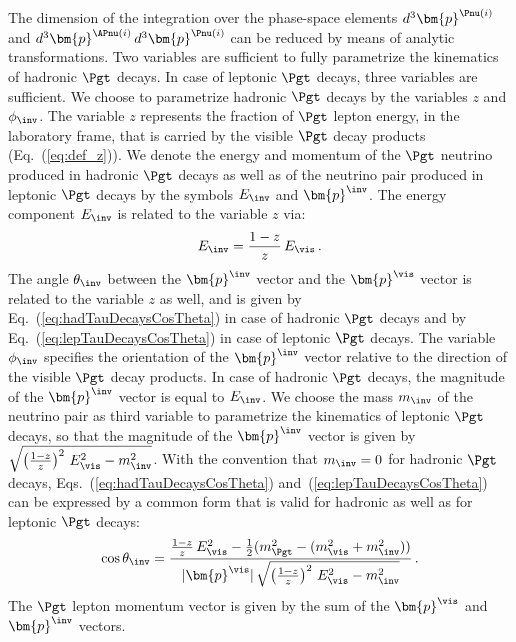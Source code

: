 The dimension of the integration over the phase-space elements
$d^{3}\bm{p}^{\Pnu(i)}$ and $d^{3}\bm{p}^{\APnu(i)} \, d^{3}\bm{p}^{\Pnu(i)}$
can be reduced by means of analytic transformations.
Two variables are sufficient to fully parametrize the kinematics of hadronic $\Pgt$ decays.
In case of leptonic $\Pgt$ decays, three variables are sufficient.
We choose to parametrize hadronic $\Pgt$ decays by the variables $z$ and $\phi_{\inv}$.
The variable $z$ represents the fraction of $\Pgt$ lepton energy, in the laboratory frame,
that is carried by the visible $\Pgt$ decay products (\cf Eq.~(\ref{eq:def_z})).
We denote the energy and momentum of the $\Pgt$ neutrino
produced in hadronic $\Pgt$ decays as well as of the neutrino pair produced in leptonic $\Pgt$
decays by the symbols $E_{\inv}$ and $\bm{p}^{\inv}$.
The energy component $E_{\inv}$ is related to the variable $z$ via:
\begin{equation}
E_{\inv} = \frac{1 - z}{z} \, E_{\vis} \, .
\label{eq:E_inv}
\end{equation}
The angle $\theta_{\inv}$ between the $\bm{p}^{\inv}$ vector and the $\bm{p}^{\vis}$ vector
is related to the variable $z$ as well, 
and is given by Eq.~(\ref{eq:hadTauDecaysCosTheta}) in case of hadronic $\Pgt$ decays 
and by Eq.~(\ref{eq:lepTauDecaysCosTheta}) in case of leptonic $\Pgt$ decays.
The variable $\phi_{\inv}$ specifies the orientation of the
$\bm{p}^{\inv}$ vector relative to the direction of the visible $\Pgt$ decay products.
In case of hadronic $\Pgt$ decays, the magnitude of the $\bm{p}^{\inv}$ vector is equal to $E_{\inv}$.
We choose the mass $m_{\inv}$ of the neutrino pair as third variable to parametrize the kinematics of leptonic $\Pgt$ decays,
so that the magnitude of the $\bm{p}^{\inv}$ vector is given by $\sqrt{\left( \frac{1 - z}{z} \right)^{2} \, E_{\vis}^{2} - m^{2}_{\inv}}$.
With the convention that $m_{\inv} = 0$ for hadronic $\Pgt$ decays,
Eqs.~(\ref{eq:hadTauDecaysCosTheta})
and~(\ref{eq:lepTauDecaysCosTheta}) can be expressed by a common form
that is valid for hadronic as well as for leptonic $\Pgt$ decays:
\begin{equation}
\cos\theta_{\inv} = \frac{\frac{1 - z}{z} \, E_{\vis}^{2} - \frac{1}{2}(m^{2}_{\Pgt} - (m^{2}_{\vis} + m^{2}_{\inv}))}{\vert\bm{p}^{\vis}\vert \, 
  \sqrt{\left( \frac{1 - z}{z} \right)^{2} \, E_{\vis}^{2} - m^{2}_{\inv}}} \, .
\label{eq:theta_inv}
\end{equation}
The $\Pgt$ lepton momentum vector is given by the sum of the
$\bm{p}^{\vis}$ and $\bm{p}^{\inv}$ vectors.

